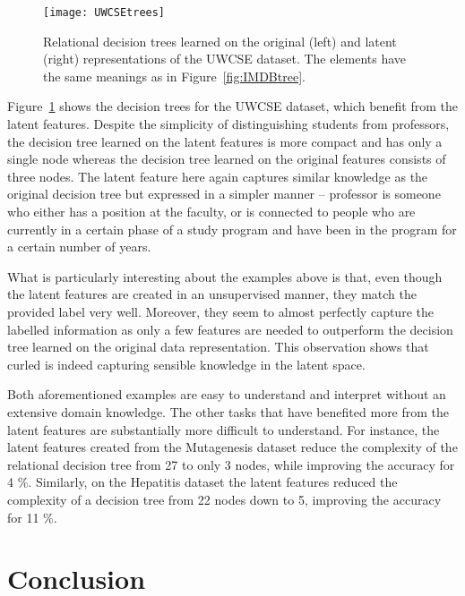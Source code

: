 \begin{figure}[t]
	\centering
	\medskip
	\texttt{[image: UWCSEtrees]}
    \caption[Explanation of the latent features invented for the UWCSE dataset]{Relational decision trees learned on the original (left) and latent (right) representations of the UWCSE dataset. The elements have the same meanings as in Figure~\ref{fig:IMDBtree}. }
    \label{fig:UWCSEtree}
\end{figure}



Figure~\ref{fig:UWCSEtree} shows the decision trees for the UWCSE dataset, which benefit from the latent features.
Despite the simplicity of distinguishing students from professors, the decision tree learned on the latent features is more compact and has only a single node whereas the decision tree learned on the original features consists of three nodes.
The latent feature here again captures similar knowledge as the original decision tree but expressed in a simpler manner -- professor is someone who either has a position at the faculty, or is connected to people who are currently in a certain phase of a study program and have been in the program for a certain number of years.




What is particularly interesting about the examples above is that, even though the latent features are created in an unsupervised manner, they match the provided label very well.
Moreover, they seem to almost perfectly capture the labelled information as only a few features are needed to outperform the decision tree learned on the original data representation.
This observation shows that \gls{curled} is indeed capturing sensible knowledge in the latent space.



Both aforementioned examples are easy to understand and interpret without an extensive domain knowledge.
The other tasks that have benefited more from the latent features are substantially more difficult to understand.
For instance, the latent features created from the Mutagenesis dataset reduce the complexity of the relational decision tree from 27 to only 3 nodes, while improving the accuracy for 4 \%.
Similarly, on the Hepatitis dataset the latent features reduced the complexity of a decision tree from 22 nodes down to 5, improving the accuracy for 11 \%.




\section{Conclusion}
\label{sec:Conc}


